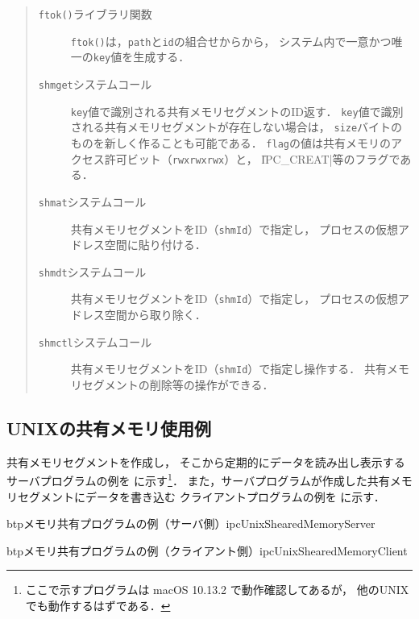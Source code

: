 \begin{quote}
\begin{description}
\item [{\tt ftok()}ライブラリ関数]
{\tt ftok()}は，{\tt path}と{\tt id}の組合せからから，
システム内で一意かつ唯一の{\tt key}値を生成する．

\item [{\tt shmget}システムコール]
{\tt key}値で識別される共有メモリセグメントのID返す．
{\tt key}値で識別される共有メモリセグメントが存在しない場合は，
{\tt size}バイトのものを新しく作ることも可能である．
{\tt flag}の値は共有メモリのアクセス許可ビット（{\tt rwxrwxrwx}）と，
\|IPC_CREAT|等のフラグである．

\item [{\tt shmat}システムコール]
共有メモリセグメントをID（{\tt shmId}）で指定し，
プロセスの仮想アドレス空間に貼り付ける．

\item [{\tt shmdt}システムコール]
共有メモリセグメントをID（{\tt shmId}）で指定し，
プロセスの仮想アドレス空間から取り除く．

\item [{\tt shmctl}システムコール]
共有メモリセグメントをID（{\tt shmId}）で指定し操作する．
共有メモリセグメントの削除等の操作ができる．
\end{description}
\end{quote}

\subsection{UNIXの共有メモリ使用例}
共有メモリセグメントを作成し，
そこから定期的にデータを読み出し表示するサーバプログラムの例を
に示す\footnote{
ここで示すプログラムは macOS 10.13.2 で動作確認してあるが，
他のUNIXでも動作するはずである．}．
また，サーバプログラムが作成した共有メモリセグメントにデータを書き込む
クライアントプログラムの例を
に示す．

\begin{myfig}{btp}{メモリ共有プログラムの例（サーバ側）}{ipcUnixShearedMemoryServer}

\end{myfig}

\begin{myfig}{btp}{メモリ共有プログラムの例（クライアント側）}{ipcUnixShearedMemoryClient}

\end{myfig}

